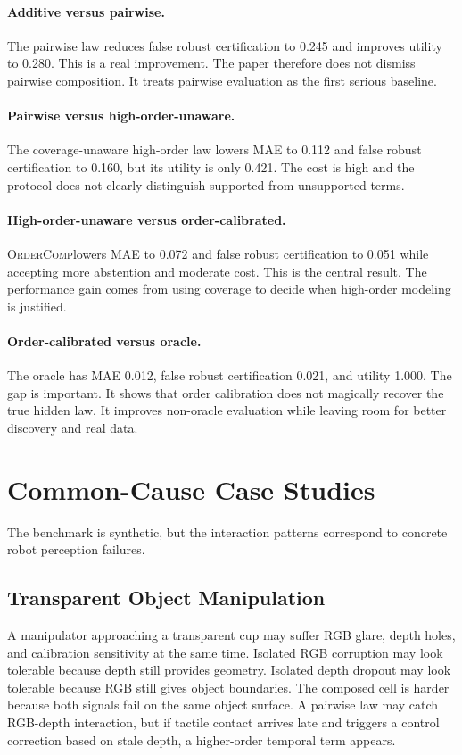 \documentclass{article}
\newcommand{\method}{\textsc{OrderComp}}
\begin{document}
\paragraph{Additive versus pairwise.}
The pairwise law reduces false robust certification to 0.245 and improves utility to 0.280. This is a real improvement. The paper therefore does not dismiss pairwise composition. It treats pairwise evaluation as the first serious baseline.

\paragraph{Pairwise versus high-order-unaware.}
The coverage-unaware high-order law lowers MAE to 0.112 and false robust certification to 0.160, but its utility is only 0.421. The cost is high and the protocol does not clearly distinguish supported from unsupported terms.

\paragraph{High-order-unaware versus order-calibrated.}
\method lowers MAE to 0.072 and false robust certification to 0.051 while accepting more abstention and moderate cost. This is the central result. The performance gain comes from using coverage to decide when high-order modeling is justified.

\paragraph{Order-calibrated versus oracle.}
The oracle has MAE 0.012, false robust certification 0.021, and utility 1.000. The gap is important. It shows that order calibration does not magically recover the true hidden law. It improves non-oracle evaluation while leaving room for better discovery and real data.

\section{Common-Cause Case Studies}

The benchmark is synthetic, but the interaction patterns correspond to concrete robot perception failures.

\subsection{Transparent Object Manipulation}

A manipulator approaching a transparent cup may suffer RGB glare, depth holes, and calibration sensitivity at the same time. Isolated RGB corruption may look tolerable because depth still provides geometry. Isolated depth dropout may look tolerable because RGB still gives object boundaries. The composed cell is harder because both signals fail on the same object surface. A pairwise law may catch RGB-depth interaction, but if tactile contact arrives late and triggers a control correction based on stale depth, a higher-order temporal term appears.
\end{document}
